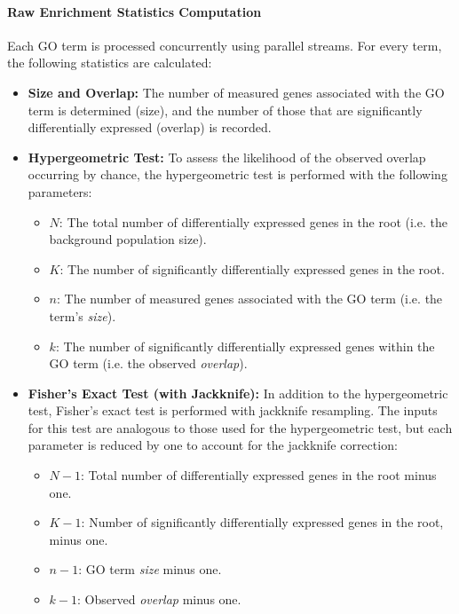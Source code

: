 \documentclass{article}
\begin{document}
    \paragraph{Raw Enrichment Statistics Computation}
    Each GO term is processed concurrently using parallel streams. For every term, the following statistics are calculated:
    \begin{itemize}
        \item \textbf{Size and Overlap:} The number of measured genes associated with the GO term is determined (size), and the number of those that are significantly differentially expressed (overlap) is recorded.
        \item \textbf{Hypergeometric Test:}
        To assess the likelihood of the observed overlap occurring by chance, the hypergeometric test is performed with the following parameters:
        \begin{itemize}
            \item $N$: The total number of differentially expressed genes in the root (i.e. the background population size).
            \item $K$: The number of significantly differentially expressed genes in the root.
            \item $n$: The number of measured genes associated with the GO term (i.e. the term’s \textit{size}).
            \item $k$: The number of significantly differentially expressed genes within the GO term (i.e. the observed \textit{overlap}).
        \end{itemize}

        \item \textbf{Fisher's Exact Test (with Jackknife):}
        In addition to the hypergeometric test, Fisher's exact test is performed with jackknife resampling. The inputs for this test are analogous to those used for the hypergeometric test, but each parameter is reduced by one to account for the jackknife correction:
        \begin{itemize}
            \item $N-1$: Total number of differentially expressed genes in the root minus one.
            \item $K-1$: Number of significantly differentially expressed genes in the root, minus one.
            \item $n-1$: GO term \textit{size} minus one.
            \item $k-1$: Observed \textit{overlap} minus one.
        \end{itemize}


\end{itemize}
\end{document}
